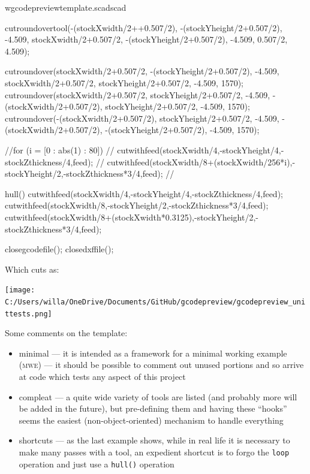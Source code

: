 \documentclass{ltxdoc}
\begin{document}
\begin{writecode}{w}{gcodepreviewtemplate.scad}{scad}
{cutroundovertool(-(stockXwidth/2++0.507/2), -(stockYheight/2+0.507/2), -4.509, stockXwidth/2+0.507/2, -(stockYheight/2+0.507/2), -4.509, 0.507/2, 4.509);

cutroundover(stockXwidth/2+0.507/2, -(stockYheight/2+0.507/2), -4.509, stockXwidth/2+0.507/2, stockYheight/2+0.507/2, -4.509, 1570);
cutroundover(stockXwidth/2+0.507/2, stockYheight/2+0.507/2, -4.509, -(stockXwidth/2+0.507/2), stockYheight/2+0.507/2, -4.509, 1570);
cutroundover(-(stockXwidth/2+0.507/2), stockYheight/2+0.507/2, -4.509, -(stockXwidth/2+0.507/2), -(stockYheight/2+0.507/2), -4.509, 1570);

//for (i = [0 : abs(1) : 80]) {
//  cutwithfeed(stockXwidth/4,-stockYheight/4,-stockZthickness/4,feed);
//  cutwithfeed(stockXwidth/8+(stockXwidth/256*i),-stockYheight/2,-stockZthickness*3/4,feed);
//  }

hull(){
  cutwithfeed(stockXwidth/4,-stockYheight/4,-stockZthickness/4,feed);
  cutwithfeed(stockXwidth/8,-stockYheight/2,-stockZthickness*3/4,feed);
  cutwithfeed(stockXwidth/8+(stockXwidth*0.3125),-stockYheight/2,-stockZthickness*3/4,feed);
  }
}

closegcodefile();
closedxffile();
\end{writecode}
\addtocounter{gcptmpl}{157}

%
%

\begin{samepage}
Which cuts as:

\texttt{[image: C:/Users/willa/OneDrive/Documents/GitHub/gcodepreview/gcodepreview\_unittests.png]}
\end{samepage}

Some comments on the template:

\begin{itemize}
\item minimal --- it is intended as a framework for a minimal working example (\textsc{mwe}) --- 
                  it should be possible to comment out unused portions and so arrive at code which 
                  tests any aspect of this project
\item compleat --- a quite wide variety of tools are listed (and probably more will be
                   added in the future), but pre-defining them and having these ``hooks'' seems
                   the easiest (non-object-oriented) mechanism to handle everything
\item shortcuts --- as the last example shows, while in real life it is necessary to make many 
                    passes with a tool, an expedient shortcut is to forgo the \verb|loop| 
                    operation and just use a \verb|hull()| operation
\end{itemize}
\end{document}
